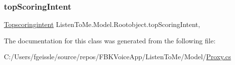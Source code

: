 \mbox{\label{class_listen_to_me_1_1_model_1_1_rootobject_a01604703f06c73a21555365a7619b6a5}} 
\subsubsection{\texorpdfstring{top\+Scoring\+Intent}{topScoringIntent}}
{\footnotesize\ttfamily \mbox{\hyperlink{class_listen_to_me_1_1_model_1_1_topscoringintent}{Topscoringintent}} Listen\+To\+Me.\+Model.\+Rootobject.\+top\+Scoring\+Intent\hspace{0.3cm}{\ttfamily [get]}, {\ttfamily [set]}}



The documentation for this class was generated from the following file\+:\begin{DoxyCompactItemize}
\item 
C\+:/\+Users/fgeissle/source/repos/\+F\+B\+K\+Voice\+App/\+Listen\+To\+Me/\+Model/\mbox{\hyperlink{_proxy_8cs}{Proxy.\+cs}}\end{DoxyCompactItemize}
